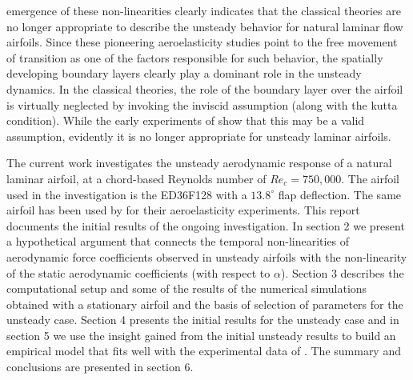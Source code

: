 emergence of these non-linearities clearly indicates that the classical theories are no longer appropriate to describe the unsteady behavior for natural laminar flow airfoils. Since these pioneering aeroelasticity studies point to the free movement of transition as one of the factors responsible for such behavior, the spatially developing boundary layers clearly play a dominant role in the unsteady dynamics. In the classical theories, the role of the boundary layer over the airfoil is virtually neglected by invoking the inviscid assumption (along with the kutta condition). While the early experiments of \cite{halfman52} show that this may be a valid assumption, evidently it is no longer appropriate for unsteady laminar airfoils.

The current work investigates the unsteady aerodynamic response of a natural laminar airfoil, at a chord-based Reynolds number of $Re_{c}=750,000$. The airfoil used in the investigation is the ED36F128 \cite{lokatt17,lokattthesis} with a $13.8^{\circ}$ flap deflection. The same airfoil has been used by \cite{lokattthesis} for their aeroelasticity experiments. This report documents the initial results of the ongoing investigation. In section 2 we present a hypothetical argument that connects the temporal non-linearities of aerodynamic force coefficients observed in unsteady airfoils with the non-linearity of the static aerodynamic coefficients (with respect to $\alpha$). Section 3 describes the computational setup and some of the results of the numerical simulations obtained with a stationary airfoil and the basis of selection of parameters for the unsteady case. Section 4 presents the initial results for the unsteady case and in section 5 we use the insight gained from the initial unsteady results to build an empirical model that fits well with the experimental data of \cite{lokattthesis}. The summary and conclusions are presented in section 6.

